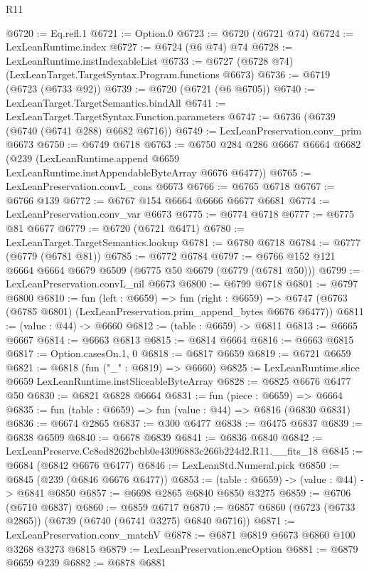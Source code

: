 \begin{lexlean}{R11}
\begin{coremodule}
@6720 := Eq.refl.{1}
@6721 := Option.{0}
@6723 := @6720 (@6721 @74)
@6724 := LexLeanRuntime.index
@6727 := @6724 (@6 @74) @74
@6728 := LexLeanRuntime.instIndexableList
@6733 := @6727 (@6728 @74) (LexLeanTarget.TargetSyntax.Program.functions @6673)
@6736 := @6719 (@6723 (@6733 @92))
@6739 := @6720 (@6721 (@6 @6705))
@6740 := LexLeanTarget.TargetSemantics.bindAll
@6741 := LexLeanTarget.TargetSyntax.Function.parameters
@6747 := @6736 (@6739 (@6740 (@6741 @288) @6682 @6716))
@6749 := LexLeanPreservation.conv_prim @6673
@6750 := @6749 @6718
@6763 := @6750
    @284
    @286
    @6667
    @6664
    @6682
    (@239 (LexLeanRuntime.append @6659 LexLeanRuntime.instAppendableByteArray @6676 @6477))
@6765 := LexLeanPreservation.convL_cons @6673
@6766 := @6765 @6718
@6767 := @6766 @139
@6772 := @6767 @154 @6664 @6666 @6677 @6681
@6774 := LexLeanPreservation.conv_var @6673
@6775 := @6774 @6718
@6777 := @6775 @81 @6677
@6779 := @6720 (@6721 @6471)
@6780 := LexLeanTarget.TargetSemantics.lookup
@6781 := @6780 @6718
@6784 := @6777 (@6779 (@6781 @81))
@6785 := @6772 @6784
@6797 := @6766 @152 @121 @6664 @6664 @6679 @6509 (@6775 @50 @6679 (@6779 (@6781 @50)))
@6799 := LexLeanPreservation.convL_nil @6673
@6800 := @6799 @6718
@6801 := @6797 @6800
@6810 := fun (left : @6659) =>
  fun (right : @6659) =>
  @6747 (@6763 (@6785 @6801) (LexLeanPreservation.prim_append_bytes @6676 @6477))
@6811 := (value : @44) -> @6660
@6812 := (table : @6659) -> @6811
@6813 := @6665 @6667
@6814 := @6663 @6813
@6815 := @6814 @6664
@6816 := @6663 @6815
@6817 := Option.casesOn.{1, 0}
@6818 := @6817 @6659
@6819 := @6721 @6659
@6821 := @6818 (fun ("_" : @6819) => @6660)
@6825 := LexLeanRuntime.slice @6659 LexLeanRuntime.instSliceableByteArray
@6828 := @6825 @6676 @6477 @50
@6830 := @6821 @6828 @6664
@6831 := fun (piece : @6659) => @6664
@6835 := fun (table : @6659) => fun (value : @44) => @6816 (@6830 @6831)
@6836 := @6674 @2865
@6837 := @300 @6477
@6838 := @6475 @6837
@6839 := @6838 @6509
@6840 := @6678 @6839
@6841 := @6836 @6840
@6842 := LexLeanPreserve.Cc8ed8262bcbb0e43096883c266b224d2.R11.__fits_18
@6845 := @6684 (@6842 @6676 @6477)
@6846 := LexLeanStd.Numeral.pick
@6850 := @6845 (@239 (@6846 @6676 @6477))
@6853 := (table : @6659) -> (value : @44) -> @6841 @6850
@6857 := @6698 @2865 @6840 @6850 @3275
@6859 := @6706 (@6710 @6837)
@6860 := @6859 @6717
@6870 := @6857 @6860 (@6723 (@6733 @2865)) (@6739 (@6740 (@6741 @3275) @6840 @6716))
@6871 := LexLeanPreservation.conv_matchV
@6878 := @6871 @6819 @6673 @6860 @100 @3268 @3273 @6815
@6879 := LexLeanPreservation.encOption
@6881 := @6879 @6659 @239
@6882 := @6878 @6881

\end{coremodule}
\end{lexlean}
